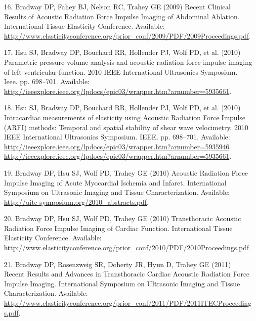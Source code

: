 \documentclass[]{article}
\begin{document}
16. Bradway DP, Fahey BJ, Nelson RC, Trahey GE (2009) Recent Clinical
Results of Acoustic Radiation Force Impulse Imaging of Abdominal
Ablation. International Tissue Elasticity Conference. Available:
\href{http://www.elasticityconference.org/prior\_conf/2009/PDF/2009Proceedings.pdf}{http://www.elasticityconference.org/prior\_conf/2009/PDF/2009Proceedings.pdf}.

17. Hsu SJ, Bradway DP, Bouchard RR, Hollender PJ, Wolf PD, et al.
(2010) Parametric pressure-volume analysis and acoustic radiation force
impulse imaging of left ventricular function. 2010 IEEE International
Ultrasonics Symposium. Ieee. pp. 698--701. Available:
\href{http://ieeexplore.ieee.org/lpdocs/epic03/wrapper.htm?arnumber=5935661}{http://ieeexplore.ieee.org/lpdocs/epic03/wrapper.htm?arnumber=5935661}.

18. Hsu SJ, Bradway DP, Bouchard RR, Hollender PJ, Wolf PD, et al.
(2010) Intracardiac measurements of elasticity using Acoustic Radiation
Force Impulse (ARFI) methods: Temporal and spatial stability of shear
wave velocimetry. 2010 IEEE International Ultrasonics Symposium. IEEE.
pp. 698--701. Available:
\href{http://ieeexplore.ieee.org/lpdocs/epic03/wrapper.htm?arnumber=5935946 http://ieeexplore.ieee.org/lpdocs/epic03/wrapper.htm?arnumber=5935661}{http://ieeexplore.ieee.org/lpdocs/epic03/wrapper.htm?arnumber=5935946
http://ieeexplore.ieee.org/lpdocs/epic03/wrapper.htm?arnumber=5935661}.

19. Bradway DP, Hsu SJ, Wolf PD, Trahey GE (2010) Acoustic Radiation
Force Impulse Imaging of Acute Myocardial Ischemia and Infarct.
International Symposium on Ultrasonic Imaging and Tissue
Characterization. Available:
\href{http://uitc-symposium.org/2010\_abstracts.pdf}{http://uitc-symposium.org/2010\_abstracts.pdf}.

20. Bradway DP, Hsu SJ, Wolf PD, Trahey GE (2010) Transthoracic Acoustic
Radiation Force Impulse Imaging of Cardiac Function. International
Tissue Elasticity Conference. Available:
\href{http://www.elasticityconference.org/prior\_conf/2010/PDF/2010Proceedings.pdf}{http://www.elasticityconference.org/prior\_conf/2010/PDF/2010Proceedings.pdf}.

21. Bradway DP, Rosenzweig SR, Doherty JR, Hyun D, Trahey GE (2011)
Recent Results and Advances in Transthoracic Cardiac Acoustic Radiation
Force Impulse Imaging. International Symposium on Ultrasonic Imaging and
Tissue Characterization. Available:
\href{http://www.elasticityconference.org/prior\_conf/2011/PDF/2011ITECProceedings.pdf}{http://www.elasticityconference.org/prior\_conf/2011/PDF/2011ITECProceedings.pdf}.
\end{document}
